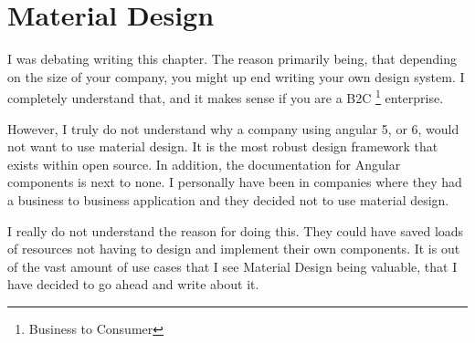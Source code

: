 \maketitle{}
\section{ Material Design }

I was debating writing this chapter. The reason primarily being, that depending
on the size of your company, you might up end writing your own design system. I
completely understand that, and it makes sense if you are a B2C
\footnote{Business to Consumer} enterprise.

However, I truly do not understand why a company using angular 5, or 6, would
not want to use material design. It is the most robust design framework that
exists within open source. In addition, the documentation for Angular components
is next to none. I personally have been in companies where they had a business
to business application and they decided not to use material design.

I really do not understand the reason for doing this. They could have saved
loads of resources not having to design and implement their own components. It
is out of the vast amount of use cases that I see Material Design being valuable,
that I have decided to go ahead and write about it.
